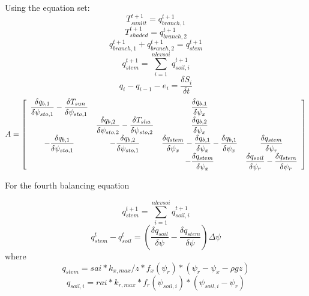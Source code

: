 \documentclass[11pt, oneside]{article}   	%
\begin{document}
Using the equation set:
\begin{equation}
T_{sunlit}^{t+1}=q_{branch,1}^{t+1}
\end{equation}
\begin{equation}
T_{shaded}^{t+1}=q_{branch,2}^{t+1}
\end{equation}
\begin{equation}
q_{branch,1}^{t+1}+q_{branch,2}^{t+1}=q_{stem}^{t+1}
\end{equation}
\begin{equation}
q_{stem}^{t+1}=\sum\limits_{i=1}^{nlevsoi}q_{soil,i}^{t+1}
\end{equation}
\begin{equation}
q_i-q_{i-1}-e_i=\dfrac{\delta S_i}{\delta t}
\end{equation}
\begin{equation}
A=
\left[ \begin {array}{cccc} 
\dfrac{\delta q_{b,1}}{\delta \psi_{sto,1}}-\dfrac{\delta T_{sun}}{\delta \psi_{sto,1}}
&&\dfrac{\delta q_{b,1}}{\delta \psi_{x}}
\cr &\dfrac{\delta q_{b,2}}{\delta \psi_{sto,2}}-\dfrac{\delta T_{sha}}{\delta \psi_{sto,2}}
&\dfrac{\delta q_{b,2}}{\delta \psi_{x}}
\cr -\dfrac{\delta q_{b,1}}{\delta \psi_{sto,1}}
&-\dfrac{\delta q_{b,2}}{\delta \psi_{sto,1}}
&\dfrac{\delta q_{stem}}{\delta \psi_{x}}-\dfrac{\delta q_{b,1}}{\delta \psi_{x}}-\dfrac{\delta q_{b,1}}{\delta \psi_{x}}
&\dfrac{\delta q_{stem}}{\delta \psi_{r}}
\cr&&-\dfrac{\delta q_{stem}}{\delta \psi_{x}}
&\dfrac{\delta q_{soil}}{\delta \psi_{r}}-\dfrac{\delta q_{stem}}{\delta \psi_{r}}
\end {array} \right]
\end{equation}


\break
For the fourth balancing equation


\begin{equation}
q_{stem}^{t+1}=\sum\limits_{i=1}^{nlevsoi}q_{soil,i}^{t+1}
\end{equation}
\begin{equation}
q_{stem}^t-q_{soil}^t=\left(\dfrac{\delta q_{soil}}{\delta \psi}-\dfrac{\delta q_{stem}}{\delta \psi}\right)\Delta \psi
\end{equation}
where
\begin{equation}
q_{stem}=sai*k_{x,max}/z*f_x\left(\psi_{r}\right)*\left(\psi_r-\psi_{x}-\rho gz\right)
\end{equation}
\begin{equation}
q_{soil,i}=rai*k_{r,max}*f_r\left(\psi_{soil,i}\right)*\left(\psi_{soil,i}-\psi_{r}\right)
\end{equation}
\end{document}
